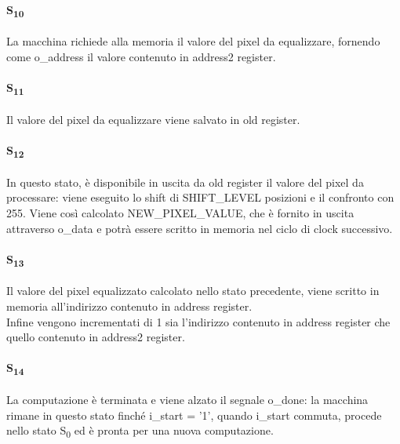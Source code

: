 \paragraph{S\textsubscript{10}}
La macchina richiede alla memoria il valore del pixel da equalizzare, fornendo come o\_address il valore contenuto in address2 register.
\paragraph{S\textsubscript{11}}
Il valore del pixel da equalizzare viene salvato in old register.
\paragraph{S\textsubscript{12}}
In questo stato, è disponibile in uscita da old register il valore del pixel da processare: viene eseguito lo shift di SHIFT\_LEVEL posizioni e il confronto con 255. Viene così calcolato NEW\_PIXEL\_VALUE, che è fornito in uscita attraverso o\_data e potrà essere scritto in memoria nel ciclo di clock successivo.
\paragraph{S\textsubscript{13}}
Il valore del pixel equalizzato calcolato nello stato precedente, viene scritto in memoria all'indirizzo contenuto in address register.\\
Infine vengono incrementati di 1 sia l'indirizzo contenuto in address register che quello contenuto in address2 register.
\paragraph{S\textsubscript{14}}
La computazione è terminata e viene alzato il segnale o\_done: la macchina rimane in questo stato finché i\_start = '1', quando i\_start commuta, procede nello stato S\textsubscript{0} ed è pronta per una nuova computazione.
